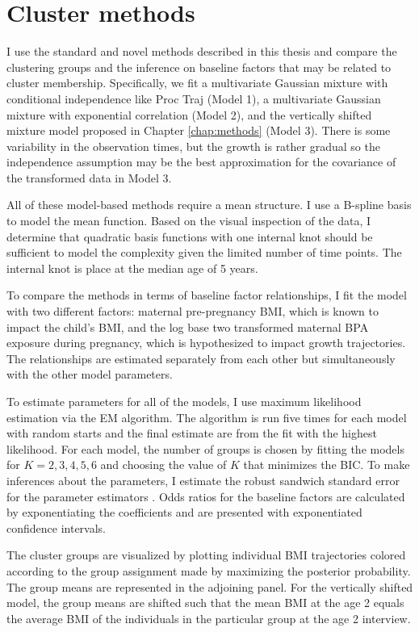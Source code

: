 \section{Cluster methods}
I use the standard and novel methods described in this thesis and compare the clustering groups and the inference on baseline factors that may be related to cluster membership. Specifically, we fit a multivariate Gaussian mixture with conditional independence like Proc Traj (Model 1), a multivariate Gaussian mixture with exponential correlation (Model 2), and the vertically shifted mixture model proposed in Chapter \ref{chap:methods} (Model 3). There is some variability in the observation times, but the growth is rather gradual so the independence assumption may be the best approximation for the covariance of the transformed data in Model 3.

All of these model-based methods require a mean structure. I use a B-spline basis to model the mean function. Based on the visual inspection of the data, I determine that quadratic basis functions with one internal knot should be sufficient to model the complexity given the limited number of time points.  The internal knot is place at the median age of 5 years. 

To compare the methods in terms of baseline factor relationships, I fit the model with two different factors: maternal pre-pregnancy BMI, which is known to impact the child's BMI, and the log base two transformed maternal BPA exposure during pregnancy, which is hypothesized to impact growth trajectories. The relationships are estimated separately from each other but simultaneously with the other model parameters.

To estimate parameters for all of the models, I use maximum likelihood estimation via the EM algorithm. The algorithm is run five times for each model with random starts and the final estimate are from the fit with the highest likelihood. For each model, the number of groups is chosen by fitting the models for $K=2,3,4,5,6$ and choosing the value of $K$ that minimizes the BIC. To make inferences about the parameters, I estimate the robust sandwich standard error for the parameter estimators \cite{white1982}. Odds ratios for the baseline factors are calculated by exponentiating the coefficients and are presented with exponentiated confidence intervals.

The cluster groups are visualized by plotting individual BMI trajectories colored according to the group assignment made by maximizing the posterior probability. The group means are represented in the adjoining panel. For the vertically shifted model, the group means are shifted such that the mean BMI at the age 2 equals the average BMI of the individuals in the particular group at the age 2 interview. 

